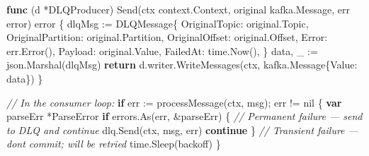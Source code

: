 \documentclass[
]{article}
\newenvironment{Shaded}{}{}
\newcommand{\CommentTok}[1]{\textcolor[rgb]{0.38,0.63,0.69}{\textit{#1}}}
\newcommand{\ControlFlowTok}[1]{\textcolor[rgb]{0.00,0.44,0.13}{\textbf{#1}}}
\newcommand{\DataTypeTok}[1]{\textcolor[rgb]{0.56,0.13,0.00}{#1}}
\newcommand{\KeywordTok}[1]{\textcolor[rgb]{0.00,0.44,0.13}{\textbf{#1}}}
\newcommand{\NormalTok}[1]{#1}
\newcommand{\OperatorTok}[1]{\textcolor[rgb]{0.40,0.40,0.40}{#1}}
\newcommand{\OtherTok}[1]{\textcolor[rgb]{0.00,0.44,0.13}{#1}}
\begin{document}
\begin{Shaded}
\begin{Highlighting}[]
\KeywordTok{func} \OperatorTok{(}\NormalTok{d }\OperatorTok{*}\NormalTok{DLQProducer}\OperatorTok{)}\NormalTok{ Send}\OperatorTok{(}\NormalTok{ctx context}\OperatorTok{.}\NormalTok{Context}\OperatorTok{,}\NormalTok{ original kafka}\OperatorTok{.}\NormalTok{Message}\OperatorTok{,}\NormalTok{ err }\DataTypeTok{error}\OperatorTok{)} \DataTypeTok{error} \OperatorTok{\{}
\NormalTok{    dlqMsg }\OperatorTok{:=}\NormalTok{ DLQMessage}\OperatorTok{\{}
\NormalTok{        OriginalTopic}\OperatorTok{:}\NormalTok{     original}\OperatorTok{.}\NormalTok{Topic}\OperatorTok{,}
\NormalTok{        OriginalPartition}\OperatorTok{:}\NormalTok{ original}\OperatorTok{.}\NormalTok{Partition}\OperatorTok{,}
\NormalTok{        OriginalOffset}\OperatorTok{:}\NormalTok{    original}\OperatorTok{.}\NormalTok{Offset}\OperatorTok{,}
\NormalTok{        Error}\OperatorTok{:}\NormalTok{             err}\OperatorTok{.}\NormalTok{Error}\OperatorTok{(),}
\NormalTok{        Payload}\OperatorTok{:}\NormalTok{           original}\OperatorTok{.}\NormalTok{Value}\OperatorTok{,}
\NormalTok{        FailedAt}\OperatorTok{:}\NormalTok{          time}\OperatorTok{.}\NormalTok{Now}\OperatorTok{(),}
    \OperatorTok{\}}
\NormalTok{    data}\OperatorTok{,}\NormalTok{ \_ }\OperatorTok{:=}\NormalTok{ json}\OperatorTok{.}\NormalTok{Marshal}\OperatorTok{(}\NormalTok{dlqMsg}\OperatorTok{)}
    \ControlFlowTok{return}\NormalTok{ d}\OperatorTok{.}\NormalTok{writer}\OperatorTok{.}\NormalTok{WriteMessages}\OperatorTok{(}\NormalTok{ctx}\OperatorTok{,}\NormalTok{ kafka}\OperatorTok{.}\NormalTok{Message}\OperatorTok{\{}\NormalTok{Value}\OperatorTok{:}\NormalTok{ data}\OperatorTok{\})}
\OperatorTok{\}}

\CommentTok{// In the consumer loop:}
\ControlFlowTok{if}\NormalTok{ err }\OperatorTok{:=}\NormalTok{ processMessage}\OperatorTok{(}\NormalTok{ctx}\OperatorTok{,}\NormalTok{ msg}\OperatorTok{);}\NormalTok{ err }\OperatorTok{!=} \OtherTok{nil} \OperatorTok{\{}
    \KeywordTok{var}\NormalTok{ parseErr }\OperatorTok{*}\NormalTok{ParseError}
    \ControlFlowTok{if}\NormalTok{ errors}\OperatorTok{.}\NormalTok{As}\OperatorTok{(}\NormalTok{err}\OperatorTok{,} \OperatorTok{\&}\NormalTok{parseErr}\OperatorTok{)} \OperatorTok{\{}
        \CommentTok{// Permanent failure — send to DLQ and continue}
\NormalTok{        dlq}\OperatorTok{.}\NormalTok{Send}\OperatorTok{(}\NormalTok{ctx}\OperatorTok{,}\NormalTok{ msg}\OperatorTok{,}\NormalTok{ err}\OperatorTok{)}
        \ControlFlowTok{continue}
    \OperatorTok{\}}
    \CommentTok{// Transient failure — don\textquotesingle{}t commit; will be retried}
\NormalTok{    time}\OperatorTok{.}\NormalTok{Sleep}\OperatorTok{(}\NormalTok{backoff}\OperatorTok{)}
\OperatorTok{\}}
\end{Highlighting}
\end{Shaded}
\end{document}
